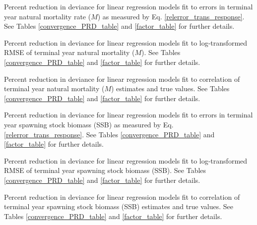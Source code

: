 \documentclass[
  12pt,
]{article}
\begin{document}
\begin{table}
\caption{Percent reduction in deviance for linear regression models fit to errors in terminal year natural mortality rate ($M$) as measured by Eq. \ref{relerror_trans_response}. See Tables \ref{convergence_PRD_table} and \ref{factor_table} for further details.}\label{bias_M_PRD_table}
{}
\end{table}
\pagebreak

\begin{table}
\caption{Percent reduction in deviance for linear regression models fit to log-transformed RMSE of terminal year natural mortality ($M$). See Tables \ref{convergence_PRD_table} and \ref{factor_table} for further details.}\label{rmse_M_PRD_table}
{}
\end{table}
\pagebreak

\begin{table}
\caption{Percent reduction in deviance for linear regression models fit to correlation of terminal year natural mortality ($M$) estimates and true values. See Tables \ref{convergence_PRD_table} and \ref{factor_table} for further details.}\label{corr_M_PRD_table}
{}
\end{table}
\pagebreak

\begin{table}
\caption{Percent reduction in deviance for linear regression models fit to errors in terminal year spawning stock biomass (SSB) as measured by Eq. \ref{relerror_trans_response}. See Tables \ref{convergence_PRD_table} and \ref{factor_table} for further details.}\label{bias_SSB_PRD_table}
{}
\end{table}
\pagebreak

\begin{table}
\caption{Percent reduction in deviance for linear regression models fit to log-transformed RMSE of terminal year spawning stock biomass (SSB). See Tables \ref{convergence_PRD_table} and \ref{factor_table} for further details.}\label{rmse_SSB_PRD_table}
{}
\end{table}
\pagebreak

\begin{table}
\caption{Percent reduction in deviance for linear regression models fit to correlation of terminal year spawning stock biomass (SSB) estimates and true values. See Tables \ref{convergence_PRD_table} and \ref{factor_table} for further details.}\label{corr_ssb_PRD_table}
{}
\end{table}
\pagebreak
\end{document}
